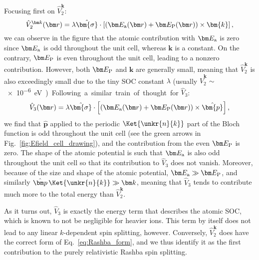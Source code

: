 Focusing first on $\hat{V}^{\bm k}_2$:
\begin{equation}
	\label{eq:Rashba_purerel}
	\hat{V}^{\bm k}_2(\bm r) = \lambda \hat{\bm{\sigma}} \cdot \left[ \left(\bm E_{\rm a}(\bm r) + \bm E_{\rm P}(\bm r)\right) \times \bm{k}\right],
\end{equation}
we can observe in the figure that the atomic contribution with $\bm E_{\rm a}$ is zero since $\bm E_{\rm a}$ is odd throughout the unit cell, whereas $\bm k$ is a constant.
On the contrary, $\bm E_{\rm P}$ is even throughout the unit cell, leading to a nonzero contribution.
However, both $\bm E_{\rm P}$ and $\bm k$ are generally small, meaning that $\hat{V}^{\bm k}_2$ is also exceedingly small due to the tiny SOC constant $\lambda$ (usually $\hat{V}^{\bm k}_2 \sim$ \SI{e-6}eV).
    
Following a similar train of thought for $\hat{V}_3$:
\begin{equation}
	\hat{V}_3(\bm r) = \lambda \hat{\bm{\sigma}} \cdot \left[ (\bm E_{\rm a}(\bm r) + \bm E_{\rm P}(\bm r)) \times \hat{\bm{p}}\right],
\end{equation}
we find that $\hat{\bm p}$ applied to the periodic $\Ket{\unkr{n}{k}}$ part of the Bloch function is odd throughout the unit cell (see the green arrows in Fig.~\ref{fig:Efield_cell_drawing}), and the contribution from the even $\bm E_{\rm P}$ is zero.
The shape of the atomic potential is such that $\bm E_{\rm a}$ is also odd throughout the unit cell so that its contribution to $\hat{V}_3$ does not vanish.
Moreover, because of the size and shape of the atomic potential, $\bm E_{\rm a} \gg \bm E_{\rm P}$, and similarly $\hat{\bm p}\,\Ket{\unkr{n}{k}} \gg \bm k$, meaning that $\hat{V}_3$ tends to contribute much more to the total energy than $\hat{V}^{\bm k}_2$.

As it turns out, $\hat{V}_3$ is exactly the energy term that describes the atomic SOC, which is known to not be negligible for heavier ions.
This term by itself does not lead to any linear $k$-dependent spin splitting, however.
Conversely, $\hat{V}_2^{\bm k}$ does have the correct form of Eq.~\eqref{eq:Rashba_form}, and we thus identify it as the first contribution to the purely relativistic Rashba spin splitting.
\newcommand{\unks}[1]{u_{#1, \bm{\sigma}}^{\bm{k}_0}}

